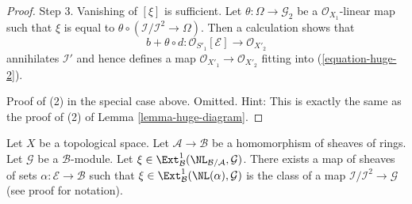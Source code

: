 \begin{proof}
\medskip\noindent
Step 3. Vanishing of $[\xi]$ is sufficient. Let
$\theta : \Omega \to \mathcal{G}_2$ be a $\mathcal{O}_{X_1}$-linear map
such that $\xi$ is equal to
$\theta \circ (\mathcal{I}/\mathcal{I}^2 \to \Omega)$.
Then a calculation shows that
$$
b + \theta \circ d : \mathcal{O}_{S'_1}[\mathcal{E}] \to \mathcal{O}_{X'_2}
$$
annihilates $\mathcal{I}'$ and hence defines a map
$\mathcal{O}_{X'_1} \to \mathcal{O}_{X'_2}$ fitting into
(\ref{equation-huge-2}).

\medskip\noindent
Proof of (2) in the special case above. Omitted. Hint:
This is exactly the same as the proof of (2) of Lemma \ref{lemma-huge-diagram}.
\end{proof}

\begin{lemma}
\label{lemma-NL-represent-ext-class}
Let $X$ be a topological space. Let $\mathcal{A} \to \mathcal{B}$ be a
homomorphism of sheaves of rings. Let $\mathcal{G}$ be a $\mathcal{B}$-module.
Let
$\xi \in \Ext^1_\mathcal{B}(\NL_{\mathcal{B}/\mathcal{A}}, \mathcal{G})$. 
There exists a map of sheaves of sets $\alpha : \mathcal{E} \to \mathcal{B}$
such that $\xi \in \Ext^1_\mathcal{B}(\NL(\alpha), \mathcal{G})$
is the class of a map $\mathcal{I}/\mathcal{I}^2 \to \mathcal{G}$
(see proof for notation).
\end{lemma}

